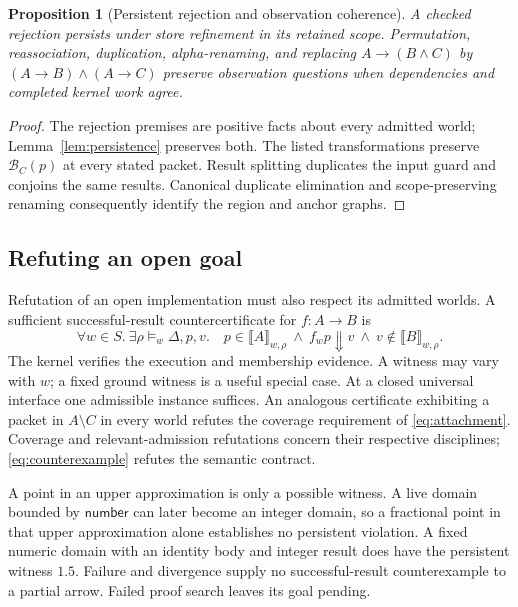 \documentclass[10pt,a4paper]{article}
\newcommand{\sem}[1]{\llbracket #1\rrbracket}
\newcommand{\Num}{\mathsf{number}}
\newtheorem{proposition}[definition]{Proposition}
\theoremstyle{remark}
\newcounter{example}[section]
\begin{document}
\begin{proposition}[Persistent rejection and observation coherence]
\label{prop:rc-coherence}
A checked rejection persists under store refinement in its retained scope.
Permutation, reassociation, duplication, alpha-renaming, and replacing
$A\to(B\land C)$ by $(A\to B)\land(A\to C)$ preserve observation questions
when dependencies and completed kernel work agree.
\end{proposition}
\begin{proof}
The rejection premises are positive facts about every admitted world;
Lemma~\ref{lem:persistence} preserves both. The listed transformations preserve
$\mathcal B_C(p)$ at every stated packet. Result splitting duplicates the
input guard and conjoins the same results. Canonical duplicate elimination and
scope-preserving renaming consequently identify the region and anchor graphs.
\end{proof}

\subsection{Refuting an open goal}
Refutation of an open implementation must also respect its admitted worlds.
A sufficient successful-result countercertificate for $f:A\to B$ is
\begin{equation}\label{eq:counterexample}
 \forall w\in S.\ \exists\rho\models_w\Delta,p,v.\quad
 p\in\sem A_{w,\rho}\ \land\ f_w p\Downarrow v\ \land\
 v\notin\sem B_{w,\rho}.
\end{equation}
The kernel verifies the execution and membership evidence. A witness may vary
with $w$; a fixed ground witness is a useful special case. At a closed universal
interface one admissible instance suffices. An analogous certificate exhibiting
a packet in $A\setminus C$ in every world refutes the coverage requirement of
\eqref{eq:attachment}. Coverage and relevant-admission refutations concern their
respective disciplines; \eqref{eq:counterexample} refutes the semantic contract.

A point in an upper approximation is only a possible witness. A live domain
bounded by $\Num$ can later become an integer domain, so a fractional point
in that upper approximation alone establishes no persistent violation. A fixed
numeric domain with an identity body and integer result does have the persistent
witness $1.5$. Failure and divergence supply no successful-result counterexample
to a partial arrow. Failed proof search leaves its goal pending.
\end{document}
